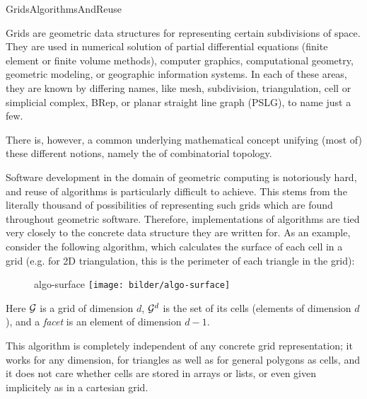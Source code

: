   \begin{Label}{GridsAlgorithmsAndReuse}
  \end{Label}

  Grids are geometric data structures for representing certain subdivisions of space.
  They are used in numerical solution of partial differential equations
  (finite element or finite volume methods),
  computer graphics, computational geometry, geometric modeling, 
  or geographic information systems.
  In each of these areas, they are known by differing names,
  like mesh, subdivision, triangulation, cell or simplicial complex, 
  BRep, or planar straight line graph (PSLG), to name just a few.

  There is, however, a common underlying mathematical concept unifying (most of)
  these different notions, namely the 
  of combinatorial topology.

  Software development in the domain of geometric computing is 
  notoriously hard, 
  and reuse of algorithms is particularly difficult to achieve.
  This stems from the literally thousand of possibilities of
  representing such grids which are found throughout geometric software.
  Therefore, implementations of algorithms are tied very closely to the
  concrete data structure they are written for.
  As an example, consider the following algorithm,
  which calculates the surface of each cell in a grid 
  (e.g. for 2D triangulation, this is the perimeter of each triangle in the grid):

   \begin{figure}[h]
     \begin{center}
       \begin{Label}{algo-surface}
       \T\texttt{[image: bilder/algo-surface]}
       \W{}
        \end{Label}
     \end{center}
   \end{figure}

  Here ${\cal G}$ is a grid of dimension $d$, ${\cal G}^d$ is the set of its cells
  (elements of dimension $d$), and a \emph{facet} is an element of dimension $d-1$.

  This algorithm is completely independent of any concrete grid representation;
  it works for any dimension, for triangles as well as for general polygons as cells,
  and it does not care whether cells are stored in arrays or lists, or even given
  implicitely as in a cartesian grid.

